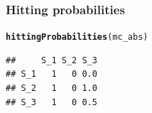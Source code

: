 \documentclass[aspectratio=169]{beamer}\usepackage[]{graphicx}\usepackage[]{xcolor}
\makeatletter
\newcommand{\hldef}[1]{\textcolor[rgb]{0.345,0.345,0.345}{#1}}%
\newcommand{\hlkwd}[1]{\textcolor[rgb]{0.737,0.353,0.396}{\textbf{#1}}}%
\newenvironment{kframe}{%
 \def\at@end@of@kframe{}%
 \ifinner\ifhmode%
  \def\at@end@of@kframe{\end{minipage}}%
  \begin{minipage}{\columnwidth}%
 \fi\fi%
 \def\FrameCommand##1{\hskip\@totalleftmargin \hskip-\fboxsep
 \colorbox{shadecolor}{##1}\hskip-\fboxsep
     \hskip-\linewidth \hskip-\@totalleftmargin \hskip\columnwidth}%
 \MakeFramed {\advance\hsize-\width
   \@totalleftmargin\z@ \linewidth\hsize
   \@setminipage}}%
 {\par\unskip\endMakeFramed%
 \at@end@of@kframe}
\newenvironment{knitrout}{}{} %
\makeatother
\begin{document}
\begin{frame}[fragile]\frametitle{Hitting probabilities}
\begin{knitrout}
\color{fgcolor}\begin{kframe}
\begin{alltt}
\hlkwd{hittingProbabilities}\hldef{(mc_abs)}
\end{alltt}
\begin{verbatim}
##     S_1 S_2 S_3
## S_1   1   0 0.0
## S_2   1   0 1.0
## S_3   1   0 0.5
\end{verbatim}
\end{kframe}
\end{knitrout}
\end{frame}

  
\end{document}
